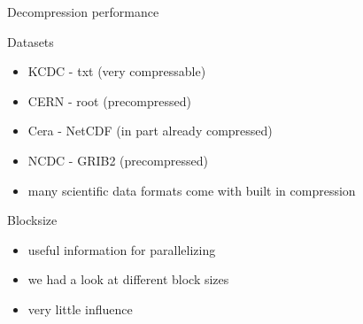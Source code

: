 \documentclass[10pt, compress]{beamer}
\begin{document}
\begin{frame}{Decompression performance}
    \begin{figure}[h]
        \begin{center}
            \scalebox{0.5}{}
        \end{center}
    \end{figure}
\end{frame}

\begin{frame}{Datasets}
    \begin{itemize}
        \item KCDC - txt (very compressable)
        \item CERN - root (precompressed)
        \item Cera - NetCDF (in part already compressed)
        \item NCDC - GRIB2 (precompressed)
        \item \textrightarrow many scientific data formats come with built in compression
    \end{itemize}
\end{frame}

\begin{frame}{Blocksize}
    \begin{itemize}
        \item useful information for parallelizing
        \item we had a look at different block sizes 
        \item very little influence
    \end{itemize}
    \vspace{-0.9em}
    \begin{figure}[h]
        \begin{center}
            \scalebox{0.42}{}
        \end{center}
    \end{figure}
\end{frame}
\end{document}
